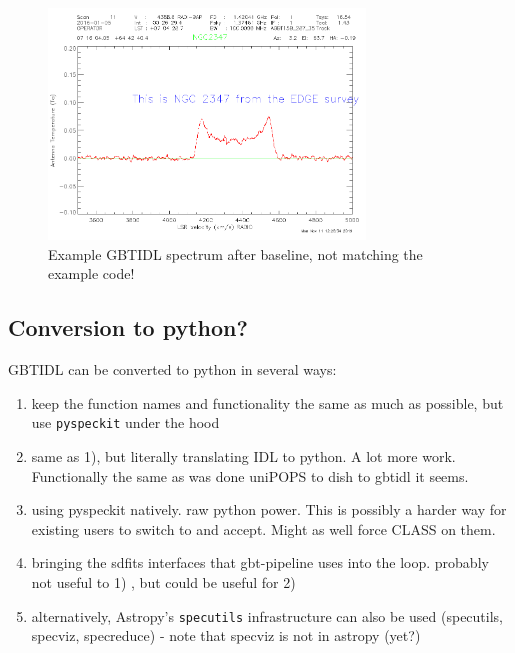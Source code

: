 \documentclass[12pt,a4paper]{article}
\begin{document}
\begin{figure}[h]
\centering
  \includegraphics[width=0.75\textwidth]{gbtidl1.png}
\caption{\label{spectrum1} Example GBTIDL spectrum after baseline, not matching the example code!}
\end{figure}


\subsection{Conversion to python?}

GBTIDL can be converted to python in several ways:

\begin{enumerate}
\item
  keep the function names and functionality the same as much as possible,
    but use {\tt pyspeckit} under the hood

\item
  same as 1), but literally  translating IDL to python. A lot more work.
  Functionally the same as  was done uniPOPS to dish to gbtidl it seems.

\item
  using pyspeckit natively. raw python power. This is possibly a harder way for
  existing users to switch to and accept. Might as well force CLASS on them.
  
\item
  bringing the sdfits interfaces that gbt-pipeline uses into the loop.
  probably not useful to 1) , but could be useful for 2)

\item
  alternatively, Astropy's {\tt specutils} infrastructure can also be used
  (specutils, specviz, specreduce) - note that specviz is not in astropy (yet?)

\end{enumerate}
\end{document}
